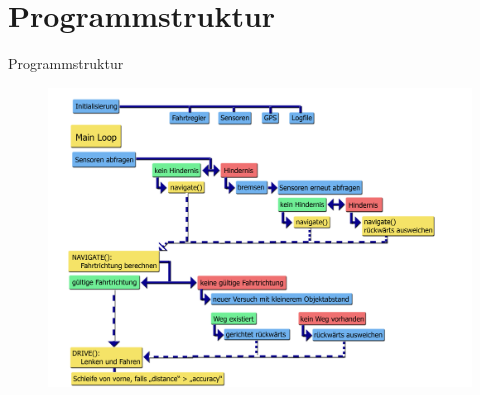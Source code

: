 \section{Programmstruktur}
\begin{frame}{Programmstruktur}
\vspace*{-.5cm}
\begin{figure}
\center
\includegraphics[height=.9\textheight]{Plots/Flowchart}
\end{figure}
\end{frame}


